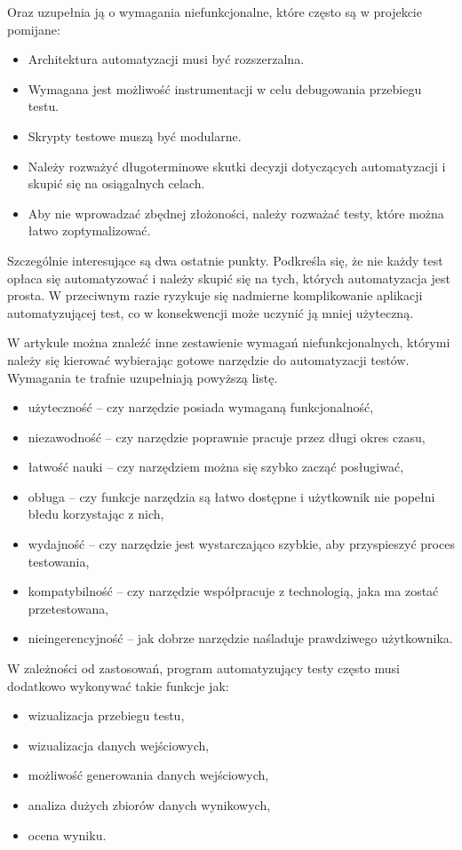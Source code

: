 \documentclass[00-praca-magisterska.tex]{subfiles}
\begin{document}
Oraz uzupełnia ją o wymagania niefunkcjonalne, które często są w projekcie
pomijane:
\begin{itemize}
\item Architektura automatyzacji musi być rozszerzalna.
\item Wymagana jest możliwość instrumentacji w celu debugowania przebiegu testu.
\item Skrypty testowe muszą być modularne.
\item Należy rozważyć długoterminowe skutki decyzji dotyczących automatyzacji i
skupić się na osiągalnych celach.
\item Aby nie wprowadzać zbędnej złożoności, należy rozważać testy,
które można łatwo zoptymalizować.
\end{itemize}

Szczególnie interesujące są dwa ostatnie punkty. Podkreśla się, że nie każdy
test opłaca się automatyzować i należy skupić się na tych, których
automatyzacja jest prosta. W przeciwnym razie ryzykuje się nadmierne
komplikowanie aplikacji automatyzującej test, co w konsekwencji może uczynić ją
mniej użyteczną.

W artykule \cite{snake-oil} można znaleźć inne zestawienie wymagań
niefunkcjonalnych, którymi należy się kierować wybierając gotowe narzędzie do
automatyzacji testów. Wymagania te trafnie uzupełniają powyższą listę.
\begin{itemize}
\item użyteczność -- czy narzędzie posiada wymaganą funkcjonalność,
\item niezawodność -- czy narzędzie poprawnie pracuje przez długi okres czasu,
\item łatwość nauki -- czy narzędziem można się szybko zacząć posługiwać,
\item obługa -- czy funkcje narzędzia są łatwo dostępne i użytkownik nie popełni błedu korzystając z nich,
\item wydajność -- czy narzędzie jest wystarczająco szybkie, aby przyspieszyć proces testowania,
\item kompatybilność -- czy narzędzie współpracuje z technologią, jaka ma zostać przetestowana,
\item nieingerencyjność -- jak dobrze narzędzie naśladuje prawdziwego użytkownika.
\end{itemize}

W zależności od zastosowań, program automatyzujący testy często musi dodatkowo
wykonywać takie funkcje jak:
\begin{itemize}
\item wizualizacja przebiegu testu,
\item wizualizacja danych wejściowych,
\item możliwość generowania danych wejściowych,
\item analiza dużych zbiorów danych wynikowych,
\item ocena wyniku.
\end{itemize}
\end{document}
